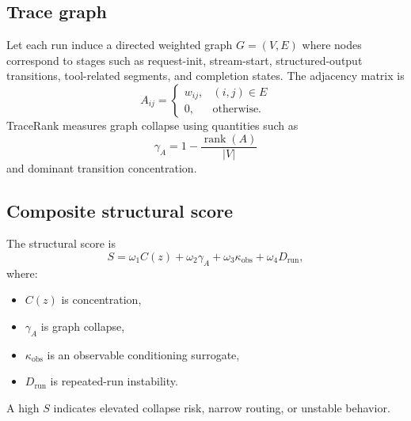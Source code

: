     \subsection{Trace graph}
    Let each run induce a directed weighted graph $G=(V,E)$ where nodes correspond to stages such as request-init, stream-start, structured-output transitions, tool-related segments, and completion states. The adjacency matrix is
    \begin{equation}
    A_{ij} =
    \begin{cases}
      w_{ij}, & (i,j)\in E \\
      0, & \text{otherwise.}
    \end{cases}
    \end{equation}
    TraceRank measures graph collapse using quantities such as
    \begin{equation}
      \gamma_A = 1 - \frac{\operatorname{rank}(A)}{|V|}
    \end{equation}
    and dominant transition concentration.
    
    \subsection{Composite structural score}
    The structural score is
    \begin{equation}
      S = \omega_1 C(z) + \omega_2 \gamma_A + \omega_3 \kappa_{\text{obs}} + \omega_4 D_{\text{run}},
    \end{equation}
    where:
    \begin{itemize}
      \item $C(z)$ is concentration,
      \item $\gamma_A$ is graph collapse,
      \item $\kappa_{\text{obs}}$ is an observable conditioning surrogate,
      \item $D_{\text{run}}$ is repeated-run instability.
    \end{itemize}
    A high $S$ indicates elevated collapse risk, narrow routing, or unstable behavior.
    
